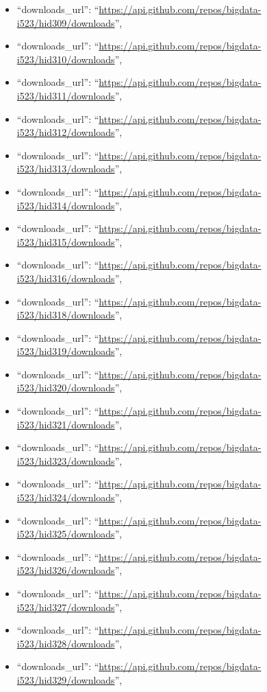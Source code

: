 \begin{itemize}
\item
  ``downloads\_url'':
  ``\url{https://api.github.com/repos/bigdata-i523/hid309/downloads}'',
\item
  ``downloads\_url'':
  ``\url{https://api.github.com/repos/bigdata-i523/hid310/downloads}'',
\item
  ``downloads\_url'':
  ``\url{https://api.github.com/repos/bigdata-i523/hid311/downloads}'',
\item
  ``downloads\_url'':
  ``\url{https://api.github.com/repos/bigdata-i523/hid312/downloads}'',
\item
  ``downloads\_url'':
  ``\url{https://api.github.com/repos/bigdata-i523/hid313/downloads}'',
\item
  ``downloads\_url'':
  ``\url{https://api.github.com/repos/bigdata-i523/hid314/downloads}'',
\item
  ``downloads\_url'':
  ``\url{https://api.github.com/repos/bigdata-i523/hid315/downloads}'',
\item
  ``downloads\_url'':
  ``\url{https://api.github.com/repos/bigdata-i523/hid316/downloads}'',
\item
  ``downloads\_url'':
  ``\url{https://api.github.com/repos/bigdata-i523/hid318/downloads}'',
\item
  ``downloads\_url'':
  ``\url{https://api.github.com/repos/bigdata-i523/hid319/downloads}'',
\item
  ``downloads\_url'':
  ``\url{https://api.github.com/repos/bigdata-i523/hid320/downloads}'',
\item
  ``downloads\_url'':
  ``\url{https://api.github.com/repos/bigdata-i523/hid321/downloads}'',
\item
  ``downloads\_url'':
  ``\url{https://api.github.com/repos/bigdata-i523/hid323/downloads}'',
\item
  ``downloads\_url'':
  ``\url{https://api.github.com/repos/bigdata-i523/hid324/downloads}'',
\item
  ``downloads\_url'':
  ``\url{https://api.github.com/repos/bigdata-i523/hid325/downloads}'',
\item
  ``downloads\_url'':
  ``\url{https://api.github.com/repos/bigdata-i523/hid326/downloads}'',
\item
  ``downloads\_url'':
  ``\url{https://api.github.com/repos/bigdata-i523/hid327/downloads}'',
\item
  ``downloads\_url'':
  ``\url{https://api.github.com/repos/bigdata-i523/hid328/downloads}'',
\item
  ``downloads\_url'':
  ``\url{https://api.github.com/repos/bigdata-i523/hid329/downloads}'',

\end{itemize}
